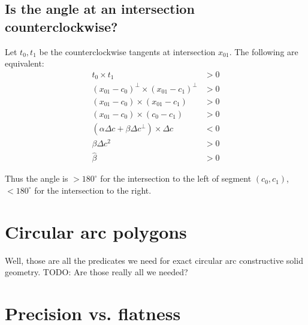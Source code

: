 \documentclass[11pt]{article}
\newcommand{\TODO}{{\color{red} TODO}}
\begin{document}
\subsection{Is the angle at an intersection counterclockwise?}

Let $t_0, t_1$ be the counterclockwise tangents at intersection $x_{01}$.  The following are equivalent:
\begin{align*}
t_0 \times t_1 &> 0 \\
(x_{01} - c_0)^\perp \times (x_{01} - c_1)^\perp &> 0 \\
(x_{01} - c_0) \times (x_{01} - c_1) &> 0 \\
(x_{01} - c_0) \times (c_0 - c_1) &> 0 \\
(\alpha \Delta c + \beta \Delta c^\perp) \times \Delta c &< 0 \\
\beta \Delta c^2 &> 0 \\
\hat{\beta} &> 0
\end{align*}

Thus the angle is $> 180^\circ$ for the intersection to the left of segment $(c_0,c_1)$, $< 180^\circ$ for the intersection to the right.

\section{Circular arc polygons}

Well, those are all the predicates we need for exact circular arc constructive solid geometry.  \TODO: Are those really all we needed?

\section{Precision vs. flatness}
\end{document}
